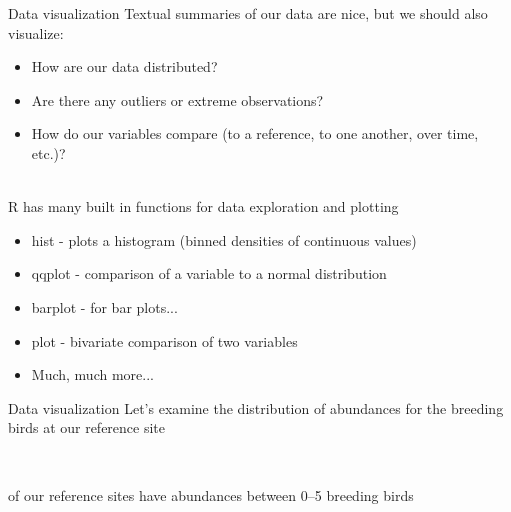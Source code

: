\documentclass[xcolor=svgnames]{beamer}
\begin{document}
\begin{frame}[fragile]{Data visualization}
Textual summaries of our data are nice, but we should also visualize:
\begin{itemize}
\item How are our data distributed?
\item Are there any outliers or extreme observations?
\item How do our variables compare (to a reference, to one another, over time, etc.)?\\~\\
\end{itemize}
\pause
R has many built in functions for data exploration and plotting
\begin{itemize}
\item hist - plots a histogram (binned densities of continuous values)
\item qqplot - comparison of a variable to a normal distribution
\item barplot - for bar plots...
\item plot - bivariate comparison of two variables
\item Much, much more...
\end{itemize}
\end{frame}

\begin{frame}[fragile]{Data visualization}
Let's examine the distribution of abundances for the breeding birds at our reference site\\~\\
\begin{columns}
\begin{column}{0.4\textwidth}
 of our reference sites have abundances between 0--5 breeding birds
\end{column}
\end{columns}
\end{frame}
\end{document}
